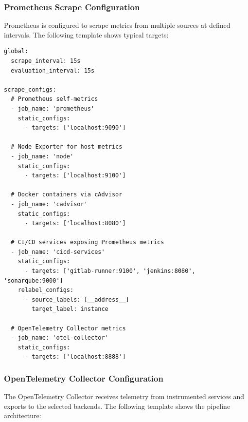 \subsubsection{Prometheus Scrape Configuration}
\label{subsubsec:prometheus_config}

Prometheus is configured to scrape metrics from multiple sources at defined intervals. The following template shows typical targets:

\begin{verbatim}
global:
  scrape_interval: 15s
  evaluation_interval: 15s

scrape_configs:
  # Prometheus self-metrics
  - job_name: 'prometheus'
    static_configs:
      - targets: ['localhost:9090']

  # Node Exporter for host metrics
  - job_name: 'node'
    static_configs:
      - targets: ['localhost:9100']

  # Docker containers via cAdvisor
  - job_name: 'cadvisor'
    static_configs:
      - targets: ['localhost:8080']

  # CI/CD services exposing Prometheus metrics
  - job_name: 'cicd-services'
    static_configs:
      - targets: ['gitlab-runner:9100', 'jenkins:8080', 'sonarqube:9000']
    relabel_configs:
      - source_labels: [__address__]
        target_label: instance

  # OpenTelemetry Collector metrics
  - job_name: 'otel-collector'
    static_configs:
      - targets: ['localhost:8888']
\end{verbatim}

\subsubsection{OpenTelemetry Collector Configuration}
\label{subsubsec:otel_collector_config}

The OpenTelemetry Collector receives telemetry from instrumented services and exports to the selected backends. The following template shows the pipeline architecture:

